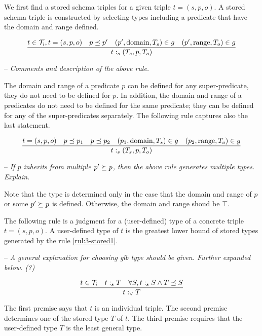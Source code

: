 \documentclass[runningheads]{llncs}
\newcommand{\Ti}{{\cal T}_i}
\newcommand{\notes}[1]{\noindent\begin{small}-- \emph{#1}\\\end{small}}
\begin{document}
We first find a stored schema triples for a given triple $t=(s,p,o)$. A
stored schema triple is constructed by selecting types including a
predicate that have the domain and range defined.

\begin{equation}
\label{rul:3-stored}
\dfrac{t\in\Ti,t=(s,p,o)\quad p\preceq\/p'\quad (p',\text{domain},T_s)\in\/g\quad (p',\text{range},T_o)\in\/g}
      {t:_s(T_s,p,T_o)}
\end{equation}


\medskip
\notes{Comments and description of the above rule.}

The domain and range of a predicate $p$ can be defined for any
super-predicate, they do not need to be defined for $p$. In addition,
the domain and range of a predicates do not need to be defined for the
same predicate; they can be defined for any of the super-predicates
separately. The following rule captures also the last statement.

\begin{equation}
\label{rul:3-stored1}
\dfrac{t=(s,p,o)\quad p\preceq\/p_1\quad p\preceq\/p_2\quad (p_1,\text{domain},T_s)\in\/g\quad (p_2,\text{range},T_o)\in\/g}
      {t:_s(T_s,p,T_o)}
\end{equation}

\notes{If $p$ inherits from multiple $p'\succeq\/p$, then the above rule generates multiple types. Explain.}

Note that the type is determined only in the case that the domain and
range of $p$ or some $p'\succeq\/p$ is defined. Otherwise, the domain
and range shoud be $\top$. 

The following rule is a judgment for a (user-defined) type of a
concrete triple $t=(s,p,o)$. A user-defined type of $t$ is the
greatest lower bound of stored types generated by the rule
\ref{rul:3-stored1}.

\notes{A general explanation for choosing glb type should be given. Further expanded below. (?)}

\begin{equation}
\dfrac{t\in\Ti\quad t:_s\/T\quad\forall\/S, t:_s\/S\land\/T\preceq\/S}
      {t:_\lor\/T}
\end{equation}


The first premise says that $t$ is an individual triple. The second
premise determines one of the stored type $T$ of $t$. The third
premise requires that the user-defined type $T$ is the least general
type.
\end{document}
